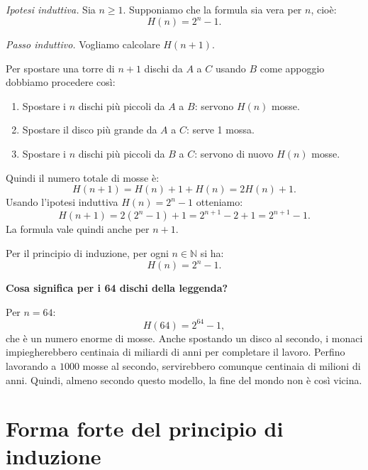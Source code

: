 \begin{esempio}
\medskip
\textit{Ipotesi induttiva.} Sia \(n \geq 1\). Supponiamo che la formula sia vera
per \(n\), cioè:
\[
H(n) = 2^n - 1.
\]

\medskip
\textit{Passo induttivo.} Vogliamo calcolare \(H(n+1)\).

Per spostare una torre di \(n+1\) dischi da \(A\) a \(C\) usando \(B\) come appoggio
dobbiamo procedere così:

\begin{enumerate}
    \item Spostare i \(n\) dischi più piccoli da \(A\) a \(B\): servono \(H(n)\) mosse.
    \item Spostare il disco più grande da \(A\) a \(C\): serve 1 mossa.
    \item Spostare i \(n\) dischi più piccoli da \(B\) a \(C\): servono di nuovo \(H(n)\) mosse.
\end{enumerate}

Quindi il numero totale di mosse è:
\[
H(n+1) = H(n) + 1 + H(n) = 2H(n) + 1.
\]
Usando l’ipotesi induttiva \(H(n) = 2^n - 1\) otteniamo:
\[
H(n+1) = 2(2^n - 1) + 1
       = 2^{n+1} - 2 + 1
       = 2^{n+1} - 1.
\]
La formula vale quindi anche per \(n+1\).

Per il principio di induzione, per ogni \(n \in \mathbb{N}\) si ha:
\[
H(n) = 2^n - 1.
\]

\medskip
\textbf{Cosa significa per i 64 dischi della leggenda?}

Per \(n = 64\):
\[
H(64) = 2^{64} - 1,
\]
che è un numero enorme di mosse. Anche spostando un disco al secondo,
i monaci impiegherebbero centinaia di miliardi di anni per completare il lavoro.
Perfino lavorando a \(1000\) mosse al secondo, servirebbero comunque centinaia di milioni di anni.
Quindi, almeno secondo questo modello, la fine del mondo non è così vicina.
\end{esempio}


\section{Forma forte del principio di induzione}


